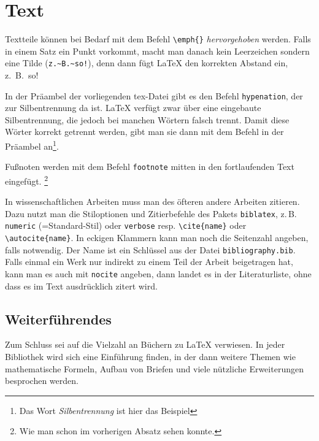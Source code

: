 \section{Text}

Textteile können bei Bedarf mit dem Befehl \verb|\emph{}| \emph{hervorgehoben} werden. Falls in einem Satz ein Punkt vorkommt, macht man danach kein Leerzeichen sondern eine Tilde (\verb|z.~B.~so!|), denn dann fügt \LaTeX{} den korrekten Abstand ein, z.~B.~so!


In der Präambel der vorliegenden tex-Datei gibt es den Befehl \verb|hypenation|, der zur Silbentrennung da ist. \LaTeX{} verfügt zwar über  eine eingebaute Silbentrennung, die jedoch bei manchen Wörtern falsch trennt. Damit diese Wörter korrekt getrennt werden, gibt man sie dann mit dem Befehl in der Präambel an\footnote{Das Wort \emph{Silbentrennung} ist hier das Beispiel}.

Fußnoten werden mit dem Befehl \verb|footnote| mitten in den fortlaufenden Text eingefügt. \footnote{Wie man schon im vorherigen Absatz sehen konnte.}

In wissenschaftlichen Arbeiten muss man des öfteren andere Arbeiten zitieren. Dazu nutzt man die Stiloptionen und Zitierbefehle des Pakets \verb+biblatex+, z.\,B.\,\verb|numeric| (=Standard-Stil) oder \verb|verbose| resp. \verb|\cite{name}| oder \verb|\autocite{name}|. In eckigen Klammern kann man noch die Seitenzahl angeben, falls notwendig. Der Name ist ein Schlüssel aus der Datei \verb|bibliography.bib|. Falls einmal ein Werk nur indirekt zu einem Teil der Arbeit beigetragen hat, kann man es auch mit \verb|nocite| angeben, dann landet es in der Literaturliste, ohne dass es im Text ausdrücklich zitert wird.


\subsection{Weiterführendes}

Zum Schluss sei auf die Vielzahl an Büchern zu \LaTeX{} verwiesen. In jeder Bibliothek wird sich eine Einführung finden, in der dann weitere Themen wie mathematische Formeln, Aufbau von Briefen und viele nützliche Erweiterungen besprochen werden.

